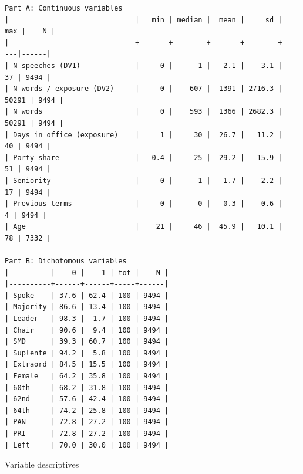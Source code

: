 \documentclass[letter,12pt]{article}
\begin{document}
\begin{table}
  \begin{scriptsize}
    \begin{verbatim}
Part A: Continuous variables
|                              |   min | median |  mean |     sd |   max |    N |
|------------------------------+-------+--------+-------+--------+-------|------|
| N speeches (DV1)             |     0 |      1 |   2.1 |    3.1 |    37 | 9494 |
| N words / exposure (DV2)     |     0 |    607 |  1391 | 2716.3 | 50291 | 9494 |
| N words                      |     0 |    593 |  1366 | 2682.3 | 50291 | 9494 |
| Days in office (exposure)    |     1 |     30 |  26.7 |   11.2 |    40 | 9494 |
| Party share                  |   0.4 |     25 |  29.2 |   15.9 |    51 | 9494 |
| Seniority                    |     0 |      1 |   1.7 |    2.2 |    17 | 9494 |
| Previous terms               |     0 |      0 |   0.3 |    0.6 |     4 | 9494 |
| Age                          |    21 |     46 |  45.9 |   10.1 |    78 | 7332 |

Part B: Dichotomous variables
|          |    0 |    1 | tot |    N |
|----------+------+------+-----+------|
| Spoke    | 37.6 | 62.4 | 100 | 9494 |
| Majority | 86.6 | 13.4 | 100 | 9494 |
| Leader   | 98.3 |  1.7 | 100 | 9494 |
| Chair    | 90.6 |  9.4 | 100 | 9494 |
| SMD      | 39.3 | 60.7 | 100 | 9494 |
| Suplente | 94.2 |  5.8 | 100 | 9494 |
| Extraord | 84.5 | 15.5 | 100 | 9494 |
| Female   | 64.2 | 35.8 | 100 | 9494 |
| 60th     | 68.2 | 31.8 | 100 | 9494 |
| 62nd     | 57.6 | 42.4 | 100 | 9494 |
| 64th     | 74.2 | 25.8 | 100 | 9494 |
| PAN      | 72.8 | 27.2 | 100 | 9494 |
| PRI      | 72.8 | 27.2 | 100 | 9494 |
| Left     | 70.0 | 30.0 | 100 | 9494 |
    \end{verbatim}
  \end{scriptsize}
\caption{Variable descriptives}\label{T:descriptives}
\end{table}
\end{document}
